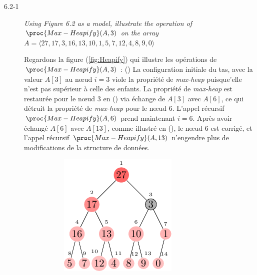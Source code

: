 \begin{description}
  \item[6.2-1] \textit{Using Figure 6.2 as a model, illustrate the operation of $\proc{Max-Heapify}(A,3)$ on the array $A = \langle 27, 17, 3, 16, 13, 10, 1, 5, 7, 12, 4, 8, 9, 0 \rangle$}
    \begin{ex}

      Regardons la figure (\ref{fig:Heapify}) qui illustre les op\'erations de $\proc{Max-Heapify}(A,3)$ : () La configuration initiale du tas, avec la valeur $A[3]$ au n\oe ud $i = 3$ viole la propri\'et\'e de \textit{max-heap} puisque'elle n'est pas sup\'erieur \`a celle des enfants. La propri\'et\'e de \textit{max-heap} est restaur\'ee pour le n\oe ud $3$ en () via \'echange de $A[3]$ avec $A[6]$, ce qui d\'etruit la propri\'et\'e de \textit{max-heap} pour le n\oe ud $6$. L'appel r\'ecursif $\proc{Max-Heapify}(A,6)$ prend maintenant $i=6$. Apr\`es  avoir \'echang\'e $A[6]$ avec $A[13]$, comme illustr\'e en (), le n\oe ud $6$ est corrig\'e, et l'appel r\'ecursif $\proc{Max-Heapify}(A,13)$ n'engendre plus de modifications de la structure de donn\'ees.

      \begin{figure}[H]
        \centering
        \begin{subfigure}[t]{.45\textwidth}
          \centering
          \includegraphics[scale=1.4]{img/6_2-1/6_2-1_1}
          \caption{}\label{fig:6_2-1_1}
        \end{subfigure}


\end{figure}
\end{ex}
\end{description}

